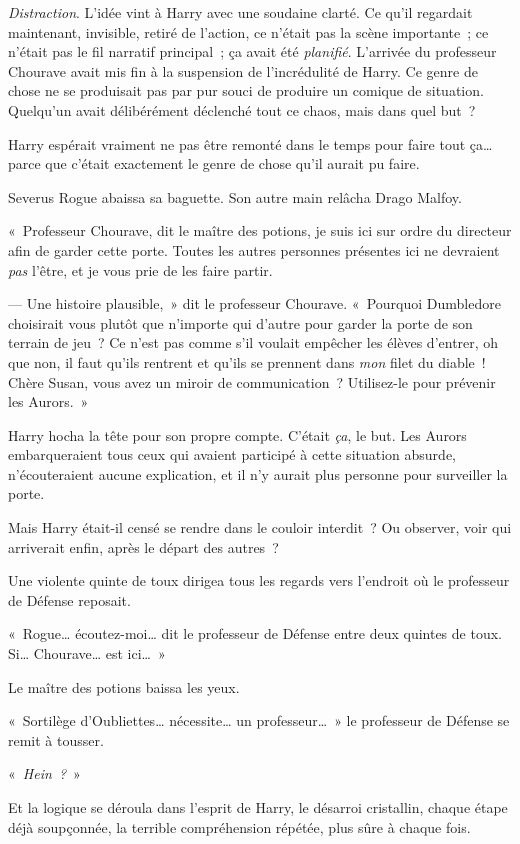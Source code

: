 \emph{Distraction}.
L'idée vint à Harry avec une soudaine clarté.
Ce qu'il regardait maintenant, invisible, retiré de l'action, ce n'était pas la scène importante~; ce n'était pas le fil narratif principal~; ça avait été \emph{planifié}.
L'arrivée du professeur Chourave avait mis fin à la suspension de l'incrédulité de Harry.
Ce genre de chose ne se produisait pas par pur souci de produire un comique de situation.
Quelqu'un avait délibérément déclenché tout ce chaos, mais dans quel but~?

Harry espérait vraiment ne pas être remonté dans le temps pour faire tout ça… parce que c'était exactement le genre de chose qu'il aurait pu faire.

Severus Rogue abaissa sa baguette.
Son autre main relâcha Drago Malfoy.

«~Professeur Chourave, dit le maître des potions, je suis ici sur ordre du directeur afin de garder cette porte.
Toutes les autres personnes présentes ici ne devraient \emph{pas} l'être, et je vous prie de les faire partir.

--- Une histoire plausible,~» dit le professeur Chourave.
«~Pourquoi Dumbledore choisirait vous plutôt que n'importe qui d'autre pour garder la porte de son terrain de jeu~?
Ce n'est pas comme s'il voulait empêcher les élèves d'entrer, oh que non, il faut qu'ils rentrent et qu'ils se prennent dans \emph{mon} filet du diable~!
Chère Susan, vous avez un miroir de communication~?
Utilisez-le pour prévenir les Aurors.~»

Harry hocha la tête pour son propre compte.
C'était \emph{ça}, le but.
Les Aurors embarqueraient tous ceux qui avaient participé à cette situation absurde, n'écouteraient aucune explication, et il n'y aurait plus personne pour surveiller la porte.

Mais Harry était-il censé se rendre dans le couloir interdit~?
Ou observer, voir qui arriverait enfin, après le départ des autres~?

Une violente quinte de toux dirigea tous les regards vers l'endroit où le professeur de Défense reposait.

«~Rogue… écoutez-moi… dit le professeur de Défense entre deux quintes de toux.
Si… Chourave… est ici…~»

Le maître des potions baissa les yeux.

«~Sortilège d'Oubliettes… nécessite… un professeur…~»
le professeur de Défense se remit à tousser.

«~\emph{Hein~?}~»

Et la logique se déroula dans l'esprit de Harry, le désarroi cristallin, chaque étape déjà soupçonnée, la terrible compréhension répétée, plus sûre à chaque fois.

